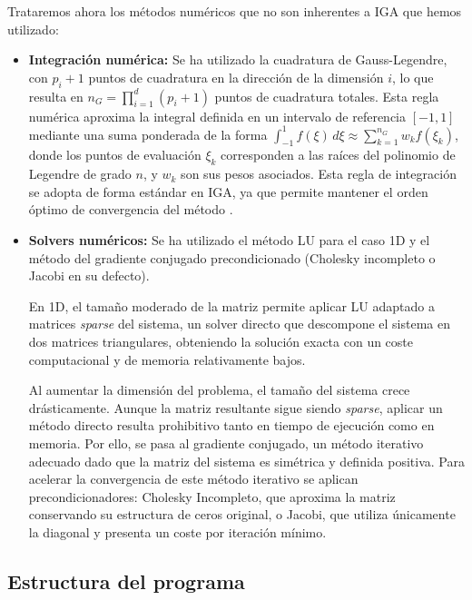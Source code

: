 \documentclass[11pt]{book}
\theoremstyle{plain} %
\theoremstyle{definition} %
\theoremstyle{definition} %
\begin{document}
Trataremos ahora los métodos numéricos que no son inherentes a IGA que hemos utilizado:

\begin{itemize}
    \item \textbf{Integración numérica:} Se ha utilizado la cuadratura de Gauss-Legendre, con $p_i+1$
            puntos de cuadratura en la dirección de la dimensión $i$, lo que resulta en $n_{G}=\prod_{i=1}^d (p_i+1)$
            puntos de cuadratura totales. Esta regla numérica aproxima la integral definida en un intervalo de referencia $[-1, 1]$
            mediante una suma ponderada de la forma $\int_{-1}^{1} f(\xi) \, d\xi \approx \sum_{k=1}^{n_{G}} w_k f(\xi_k)$,
            donde los puntos de evaluación $\xi_k$ corresponden a las raíces del polinomio de Legendre de grado $n$, y $w_k$ son
            sus pesos asociados. Esta regla de integración se adopta de forma estándar en IGA, ya que permite mantener el orden óptimo de convergencia del método \cite{bazilevs_isogeometric_2010}.    
    \item \textbf{Solvers numéricos:} Se ha utilizado el método LU para el caso 1D y el método del gradiente conjugado precondicionado (Cholesky incompleto o Jacobi en su defecto).
            
            En 1D, el tamaño moderado de la matriz permite aplicar LU adaptado a matrices \textit{sparse} del sistema,
            un solver directo que descompone el sistema en dos matrices triangulares,
            obteniendo la solución exacta con un coste computacional y de memoria relativamente bajos.

            Al aumentar la dimensión del problema, el tamaño del sistema crece drásticamente.
            Aunque la matriz resultante sigue siendo \textit{sparse}, aplicar un método directo resulta
            prohibitivo tanto en tiempo de ejecución como en memoria. Por ello, se pasa al gradiente
            conjugado, un método iterativo adecuado dado que la matriz del sistema es simétrica y definida
            positiva. Para acelerar la convergencia de este método iterativo se aplican precondicionadores:
            Cholesky Incompleto, que aproxima la matriz conservando su estructura de ceros original,
            o Jacobi, que utiliza únicamente la diagonal y presenta un coste por iteración mínimo.

\end{itemize}

\subsection{Estructura del programa}
\end{document}
